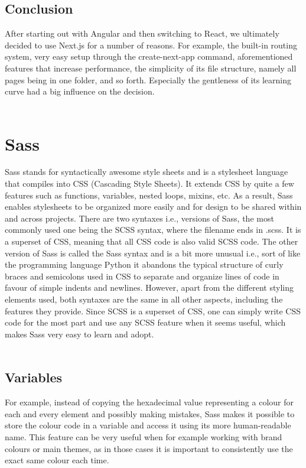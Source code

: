 \subsection{Conclusion}
After starting out with Angular and then switching to React, we ultimately decided to use Next.js for a number of reasons. For example, the built-in
routing system, very easy setup through the create-next-app command, aforementioned features that increase performance, the simplicity of its
file structure, namely all pages being in one folder, and so forth. Especially the gentleness of its learning curve had a big influence on the decision.
\\
\\
\section{Sass}
Sass stands for syntactically awesome style sheets and is a stylesheet language that compiles into CSS (Cascading Style Sheets). It extends CSS by quite
a few features such as functions, variables, nested loops, mixins, etc. As a result, Sass enables stylesheets to be organized more easily and for design
to be shared within and across projects. There are two syntaxes i.e., versions of Sass, the most commonly used one being the SCSS syntax, where the
filename ends in .scss. It is a superset of CSS, meaning that all CSS code is also valid SCSS code. The other version of Sass is called the Sass syntax
and is a bit more unusual i.e., sort of like the programming language Python it abandons the typical structure of curly braces and semicolons used in CSS
to separate and organize lines of code in favour of simple indents and newlines. However, apart from the different styling elements used, both syntaxes
are the same in all other aspects, including the features they provide. Since SCSS is a superset of CSS, one can simply write CSS code for the most part
and use any SCSS feature when it seems useful, which makes Sass very easy to learn and adopt.
\\
\\
\subsection{Variables}
For example, instead of copying the hexadecimal value representing a colour for each and every element and possibly making mistakes, Sass makes it possible
to store the colour code in a variable and access it using its more human-readable name. This feature can be very useful when for example working with brand
colours or main themes, as in those cases it is important to consistently use the exact same colour each time.
\\
\\
